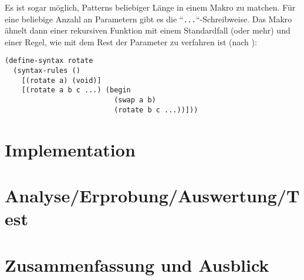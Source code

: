 Es ist sogar möglich, Patterns beliebiger Länge in einem Makro zu matchen. Für eine beliebige Anzahl an Parametern gibt es die ``\texttt{...}``-Schreibweise. Das Makro ähnelt dann einer rekursiven Funktion mit einem Standardfall (oder mehr) und einer Regel, wie mit dem Rest der Parameter zu verfahren ist (nach \cite{racketguide-macros}):

\begin{lstlisting}
(define-syntax rotate
  (syntax-rules ()
    [(rotate a) (void)]
    [(rotate a b c ...) (begin
                          (swap a b)
                          (rotate b c ...))]))
\end{lstlisting}


% 
% 




\chapter{Implementation}  %

\chapter{Analyse/Erprobung/Auswertung/Test}

\chapter{Zusammenfassung und Ausblick}



 




